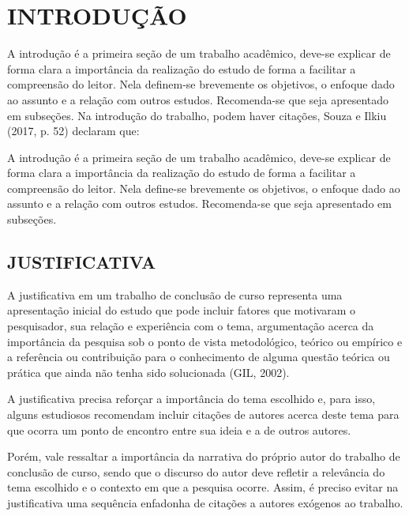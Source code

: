 \chapter{INTRODUÇÃO}
\label{introdução}

A introdução é a primeira seção de um trabalho acadêmico, deve-se explicar de forma
clara a importância da realização do estudo de forma a facilitar a compreensão do leitor.
Nela definem-se brevemente os objetivos, o enfoque dado ao assunto e a relação com
outros estudos. Recomenda-se que seja apresentado em subseções.
Na introdução do trabalho, podem haver citações, Souza e Ilkiu (2017, p. 52) declaram
que:
\begin{citacao}
A introdução é a primeira seção de um trabalho acadêmico, deve-se explicar de
forma clara a importância da realização do estudo de forma a facilitar a compreensão
do leitor. Nela define-se brevemente os objetivos, o enfoque dado ao assunto e a
relação com outros estudos. Recomenda-se que seja apresentado em subseções.
\end{citacao}

\section{JUSTIFICATIVA}
\label{justificativa}

A justificativa em um trabalho de conclusão de curso representa uma apresentação inicial do estudo que pode incluir fatores que motivaram o pesquisador, sua relação e experiência com o tema, argumentação acerca da importância da pesquisa sob o ponto de vista metodológico, teórico ou empírico e a referência ou contribuição para o conhecimento de alguma questão teórica ou prática que ainda não tenha sido solucionada (GIL, 2002).

A justificativa precisa reforçar a importância do tema escolhido e, para isso, alguns estudiosos recomendam incluir citações de autores acerca deste tema para que ocorra um ponto de encontro entre sua ideia e a de outros autores.

Porém, vale ressaltar a importância da narrativa do próprio autor do trabalho de conclusão de curso, sendo que o discurso do autor deve refletir a relevância do tema escolhido e o contexto em que a pesquisa ocorre.
Assim, é preciso evitar na justificativa uma sequência enfadonha de citações a autores exógenos ao trabalho.
